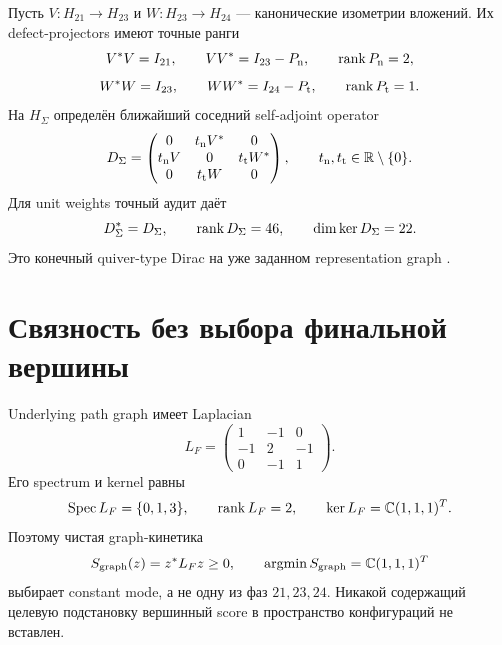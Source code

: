 Пусть $V:H_{21}\to H_{23}$ и $W:H_{23}\to H_{24}$ --- канонические
изометрии вложений. Их defect-projectors имеют точные ранги
\begin{equation}
 V^*V=I_{21},\qquad VV^*=I_{23}-P_{\rm n},
 \qquad \operatorname{rank} P_{\rm n}=2,
 \label{eq:v9-config-space-neutral-isometry}
\end{equation}
\begin{equation}
 W^*W=I_{23},\qquad WW^*=I_{24}-P_{\rm t},
 \qquad \operatorname{rank} P_{\rm t}=1.
 \label{eq:v9-config-space-triplet-isometry}
\end{equation}
На $H_\Sigma$ определён ближайший соседний self-adjoint operator
\begin{equation}
 D_\Sigma=
 \begin{pmatrix}
 0&t_{\rm n}V^*&0\\
 t_{\rm n}V&0&t_{\rm t}W^*\\
 0&t_{\rm t}W&0
 \end{pmatrix},
 \qquad t_{\rm n},t_{\rm t}\in\mathbb R\setminus\{0\}.
 \label{eq:v9-config-space-dirac-block}
\end{equation}
Для unit weights точный аудит даёт
\begin{equation}
 D_\Sigma^*=D_\Sigma,
 \qquad \operatorname{rank} D_\Sigma=46,
 \qquad \dim\ker D_\Sigma=22.
 \label{eq:v9-config-space-dirac-rank}
\end{equation}
Это конечный quiver-type Dirac на уже заданном representation graph
\cite{v9-config-space-krajewski,v9-config-space-quiver-action}.

\section{Связность без выбора финальной вершины}

Underlying path graph имеет Laplacian
\begin{equation}
 L_F=\begin{pmatrix}1&-1&0\\-1&2&-1\\0&-1&1\end{pmatrix}.
 \label{eq:v9-config-space-laplacian}
\end{equation}
Его spectrum и kernel равны
\begin{equation}
 \operatorname{Spec} L_F=\{0,1,3\},
 \qquad \operatorname{rank} L_F=2,
 \qquad \ker L_F=\mathbb C(1,1,1)^T.
 \label{eq:v9-config-space-laplacian-spectrum}
\end{equation}
Поэтому чистая graph-кинетика
\begin{equation}
 S_{\rm graph}(z)=z^*L_Fz\geq0,
 \qquad \operatorname*{argmin}S_{\rm graph}=\mathbb C(1,1,1)^T
 \label{eq:v9-config-space-graph-minimum}
\end{equation}
выбирает constant mode, а не одну из фаз $21,23,24$. Никакой содержащий целевую подстановку
вершинный score в пространство конфигураций не вставлен.

